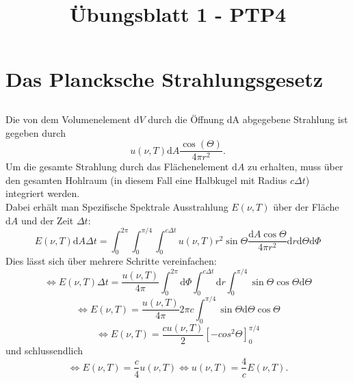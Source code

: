 \documentclass[a4paper,11pt]{article}
\title{Übungsblatt 1 - PTP4}
\author{}
\date{}
\begin{document}
\maketitle

\section{Das Plancksche Strahlungsgesetz}

\subsection{}
Die von dem Volumenelement $\text{d}V$ durch die Öffnung dA abgegebene Strahlung ist gegeben durch 
\begin{equation}
    u(\nu, T)\text{d}A \frac{\cos(\Theta)}{4\pi r^2}.
\end{equation}
Um die gesamte Strahlung durch das Flächenelement $\text{d}A$ zu erhalten, muss über den gesamten Hohlraum (in diesem Fall eine Halbkugel mit Radius $c\Delta t$) integriert werden.\\
Dabei erhält man Speziﬁsche Spektrale Ausstrahlung $E(\nu, T)$ über der Fläche $\text{d}A$ und der Zeit $\Delta t$:
\begin{equation}
    E(\nu, T)\text{d}A\Delta t = \int_{0}^{2\pi}\int_{0}^{\pi/4}\int_{0}^{c\Delta t} u(\nu, T) r^2 \sin\Theta \frac{\text{d}A \cos\Theta}{4\pi r^2} \text{d}r \text{d}\Theta \text{d}\Phi
\end{equation}
Dies lässt sich über mehrere Schritte vereinfachen:
\begin{equation}
    \Leftrightarrow E(\nu, T)\Delta t = \frac{u(\nu, T)}{4\pi}\int_{0}^{2\pi}\text{d}\Phi\int_{0}^{c\Delta t} \text{d}r \int_{0}^{\pi/4} \sin\Theta \cos\Theta \text{d}\Theta
\end{equation}
\begin{equation}
    \Leftrightarrow E(\nu, T) = \frac{u(\nu, T)}{4\pi}2\pi c\int_{0}^{\pi/4} \sin\Theta \text{d}\Theta \cos\Theta
\end{equation}
\begin{equation}
    \Leftrightarrow E(\nu, T) = \frac{cu(\nu, T)}{2}[-cos^2\Theta]_{0}^{\pi/4}
\end{equation}
und schlussendlich
\begin{equation}
    \Leftrightarrow E(\nu, T) = \frac{c}{4} u(\nu, T) \Leftrightarrow u(\nu, T) = \frac{4}{c}E(\nu, T).
\end{equation}

\subsection{}
\end{document}
